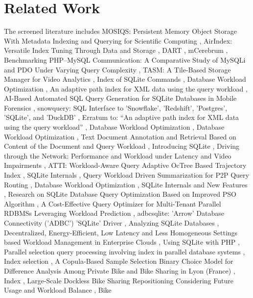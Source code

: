 \documentclass{article}
\begin{document}
\section{Related Work}
The screened literature includes MOSIQS: Persistent Memory Object Storage With Metadata Indexing and Querying for Scientific Computing \cite{khan2021mosiqsc8a373f2}, AirIndex: Versatile Index Tuning Through Data and Storage \cite{chockchowwat2023airindex34a18a07}, DART \cite{zhang2018dartcaf51a21}, mCerebrum \cite{hossain2017mcerebrum799408b7}, Benchmarking PHP–MySQL Communication: A Comparative Study of MySQLi and PDO Under Varying Query Complexity \cite{andrijevi2025benchmarkingedda800b}, TASM: A Tile-Based Storage Manager for Video Analytics \cite{daum2021tasm968093c3}, Index of SQLite Commands \cite{paper2019indexa7e7403c}, Database Workload Optimization \cite{fritchey2018databasefc41a48e}, An adaptive path index for XML data using the query workload \cite{min2005adaptive522ab6b5}, AI-Based Automated SQL Query Generation for SQLite Databases in Mobile Forensics \cite{pawlaszczyk2026aibased9504562c}, snowquery: SQL Interface to 'Snowflake', 'Redshift', 'Postgres', 'SQLite', and 'DuckDB' \cite{mermelstein2023snowquery83be4a32}, Erratum to: “An adaptive path index for XML data using the query workload” \cite{min2006erratumb6de907d}, Database Workload Optimization \cite{paper2009database4b698fc5}, Database Workload Optimization \cite{fritchey2014database9cd5798d}, Text Document Annotation and Retrieval Based on Content of the Document and Query Workload \cite{paper2016textdf2c3837}, Introducing SQLite \cite{paperndintroducing2717579a}, Driving through the Network: Performance and Workload under Latency and Video Impairments \cite{trautmannsheimer2026drivingff61bd6f}, ATTI: Workload-Aware Query Adaptive OcTree Based Trajectory Index \cite{meng2013attie06ff60a}, SQLite Internals \cite{paperndsqlite4662a699}, Query Workload Driven Summarization for P2P Query Routing \cite{nguyen2008query2c2d2603}, Database Workload Optimization \cite{fritchey2012databasea16044b3}, SQLite Internals and New Features \cite{allen2010sqliteea10af9e}, Research on SQLite Database Query Optimization Based on Improved PSO Algorithm \cite{zhao2016researchae69112a}, A Cost-Effective Query Optimizer for Multi-Tenant Parallel RDBMSs Leveraging Workload Prediction \cite{danaouindcosteffective0bc696d1}, adbcsqlite: 'Arrow' Database Connectivity ('ADBC') 'SQLite' Driver \cite{dunnington2023adbcsqlite4ed401bf}, Analyzing SQLite Databases \cite{languedoc2016analyzing1421fa41}, Decentralized, Energy-Efficient, Low Latency and Less Homogeneous Settings based Workload Management in Enterprise Clouds \cite{bhuvaneshwari2016decentralized2a4a7840}, Using SQLite with PHP \cite{feiler2015usingf141f28c}, Parallel selection query processing involving index in parallel database systems \cite{rahayundparallel50c83349}, Index selection \cite{sun2013indexd06a71f0}, A Copula-Based Sample Selection Binary Choice Model for Difference Analysis Among Private Bike and Bike Sharing in Lyon (France) \cite{havet2024copulabased072061f0}, Index \cite{paper2015indexf37979dd}, Large-Scale Dockless Bike Sharing Repositioning Considering Future Usage and Workload Balance \cite{hua2022largescalea3dcd6e3}, Bike 
\end{document}

